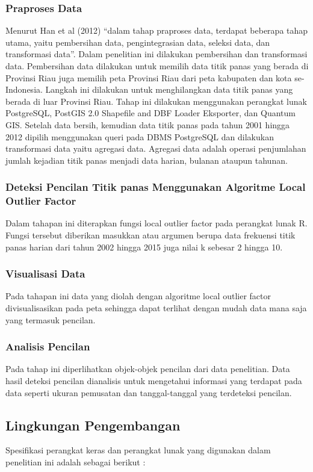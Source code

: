 \subsubsection*{Praproses Data}	
Menurut Han et al (2012) “dalam tahap praproses data, terdapat beberapa tahap utama, yaitu pembersihan data, pengintegrasian data, seleksi data, dan transformasi data”. Dalam penelitian ini dilakukan pembersihan dan transformasi data. Pembersihan data dilakukan untuk memilih data titik panas yang berada di Provinsi Riau juga memilih peta Provinsi Riau dari peta kabupaten dan kota se-Indonesia. Langkah ini dilakukan untuk menghilangkan data titik panas yang berada di luar Provinsi Riau. Tahap ini dilakukan menggunakan perangkat lunak PostgreSQL, PostGIS 2.0 Shapefile and DBF Loader Eksporter, dan Quantum GIS.
Setelah data bersih, kemudian data titik panas pada tahun 2001 hingga 2012 dipilih  menggunakan queri pada DBMS PostgreSQL dan dilakukan transformasi data yaitu agregasi data. Agregasi data adalah operasi penjumlahan jumlah kejadian titik panas menjadi data harian, bulanan ataupun tahunan. 

\subsubsection*{Deteksi Pencilan Titik panas Menggunakan Algoritme Local Outlier Factor}
Dalam tahapan ini diterapkan fungsi local outlier factor pada perangkat lunak R. Fungsi tersebut diberikan masukkan atau argumen berupa data frekuensi titik panas harian dari tahun 2002 hingga 2015 juga nilai k sebesar 2 hingga 10. 

\subsubsection*{Visualisasi Data}
Pada tahapan ini data yang diolah dengan algoritme local outlier factor divisualisasikan pada peta sehingga dapat terlihat dengan mudah data mana saja yang termasuk pencilan.

\subsubsection*{Analisis Pencilan}
Pada tahap ini diperlihatkan objek-objek pencilan dari data penelitian. Data hasil deteksi pencilan dianalisis untuk mengetahui informasi yang terdapat pada data seperti ukuran pemusatan dan tanggal-tanggal yang terdeteksi pencilan.

\subsection*{Lingkungan Pengembangan}
Spesifikasi perangkat keras dan perangkat lunak yang digunakan dalam penelitian ini adalah sebagai berikut :

